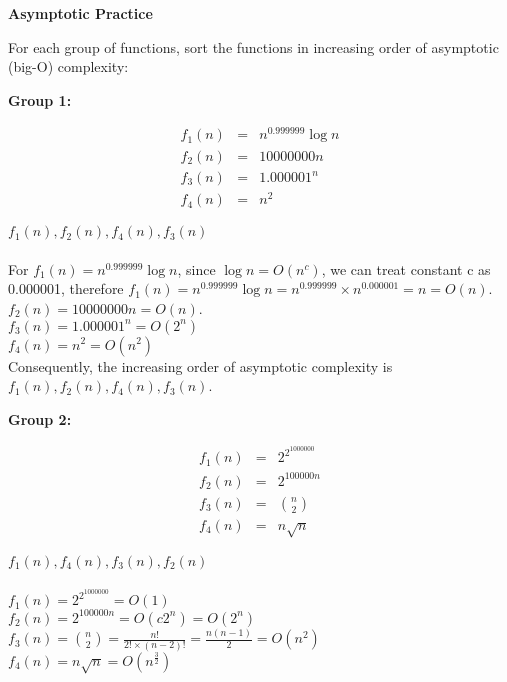 \documentclass[12pt,twoside]{article}
\begin{document}
\begin{problems}

\problem {} \textbf{Asymptotic Practice}

For each group of functions, sort the functions in increasing order of
asymptotic (big-O) complexity:

\begin{problemparts}

\problempart {} \textbf{Group 1:}

$$
\begin{array}{rcl}
f_1(n) &=& n^{0.999999} \log n \\
f_2(n) &=& 10000000 n \\
f_3(n) &=& 1.000001^n \\
f_4(n) &=& n^2
\end{array}
$$

\ifsolution \solution{}
$f_1(n),f_2(n),f_4(n),f_3(n)$
\\
\\
For $f_1(n)= n^{0.999999} \log n$, since $\log n =O(n^c)$, we can treat constant c as 0.000001,
therefore $f_1(n)= n^{0.999999} \log n = n^{0.999999} \times n^{0.000001} = n = O(n)$.\\
$f_2(n) = 10000000 n=O(n)$.\\
$f_3(n) = 1.000001^n =O(2^n)$\\
$f_4(n) = n^2 = O(n^2)$\\
Consequently, the increasing order of asymptotic complexity is $f_1(n),f_2(n),f_4(n),f_3(n)$.
\\
\fi

\problempart {} \textbf{Group 2:}

$$
\begin{array}{rcl}
f_1(n) &=& 2^{2^{1000000}} \\
f_2(n) &=& 2^{100000n} \\
f_3(n) &=& \displaystyle \binom{n}{2} \\
f_4(n) &=& n \sqrt{n}
\end{array}
$$

\ifsolution \solution{}
$f_1(n),f_4(n),f_3(n),f_2(n)$
\\
\\
$f_1(n) = 2^{2^{1000000}} = O(1)$\\
$f_2(n) = 2^{100000n} = O(c2^{n}) = O(2^n)$\\
$f_3(n) = \displaystyle \binom{n}{2} = \frac{n!}{2!\times(n-2)!} = \frac{n(n-1)}{2} = O(n^2)$\\
$f_4(n) = n \sqrt{n} = O(n^{\frac{3}{2}})$


\end{problemparts}
\end{problems}
\end{document}
